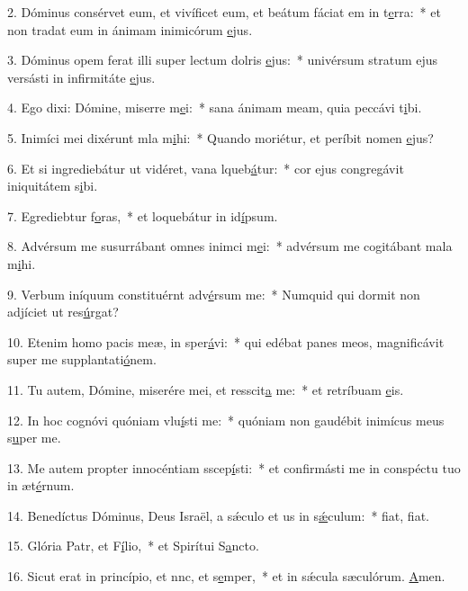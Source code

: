 2. Dóminus consérvet eum, et vivíficet eum, et beátum fáciat em in t\uline{e}rra:~* et non tradat eum in ánimam inimicórum \uline{e}jus.\par 
3. Dóminus opem ferat illi super lectum dolris \uline{e}jus:~* univérsum stratum ejus versásti in infirmitáte \uline{e}jus.\par 
4. Ego dixi: Dómine, miserre m\uline{e}i:~* sana ánimam meam, quia peccávi t\uline{i}bi.\par 
5. Inimíci mei dixérunt mla m\uline{i}hi:~* Quando moriétur, et períbit nomen \uline{e}jus?\par 
6. Et si ingrediebátur ut vidéret, vana lqueb\uline{á}tur:~* cor ejus congregávit iniquitátem s\uline{i}bi.\par 
7. Egrediebtur f\uline{o}ras,~* et loquebátur in id\uline{í}psum.\par 
8. Advérsum me susurrábant omnes inimci m\uline{e}i:~* advérsum me cogitábant mala m\uline{i}hi.\par 
9. Verbum iníquum constituérnt adv\uline{é}rsum me:~* Numquid qui dormit non adjíciet ut res\uline{ú}rgat?\par 
10. Etenim homo pacis meæ, in  sper\uline{á}vi:~* qui edébat panes meos, magnificávit super me supplantati\uline{ó}nem.\par 
11. Tu autem, Dómine, miserére mei, et resscit\uline{a} me:~* et retríbuam \uline{e}is.\par 
12. In hoc cognóvi quóniam vlu\uline{í}sti me:~* quóniam non gaudébit inimícus meus s\uline{u}per me.\par 
13. Me autem propter innocéntiam sscep\uline{í}sti:~* et confirmásti me in conspéctu tuo in æt\uline{é}rnum.\par 
14. Benedíctus Dóminus, Deus Israël, a sǽculo et us in s\uline{ǽ}culum:~* fiat, f\uline{i}at.\par 
15. Glória Patr, et F\uline{í}lio,~* et Spirítui S\uline{a}ncto.\par 
16. Sicut erat in princípio, et nnc, et s\uline{e}mper,~* et in sǽcula sæculórum. \uline{A}men.\par 
